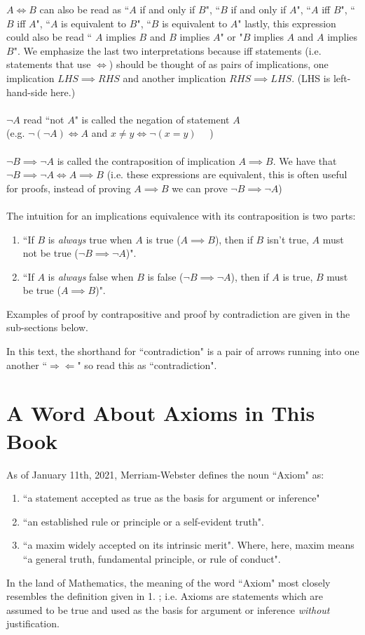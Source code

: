 $A\iff B$ can also be read as ``$A$ if and only if $B$", ``$B$ if and only if $A$", ``$A$ iff $B$", ``$B$ iff $A$", ``$A$ is equivalent to $B$", ``$B$ is equivalent to $A$" lastly, this expression could also be read `` $A$ implies $B$ and $B$ implies $A$" or "$B$ implies $A$ and $A$ implies $B$". We emphasize the last two interpretations because iff statements (i.e. statements that use $\iff$) should be thought of as pairs of implications, one implication $LHS\implies RHS$ and another implication $RHS \implies LHS$. (LHS is left-hand-side here.)\\ \\
$\lnot A$ read ``not $A$" is called the negation of statement $A$ \\(e.g. $\lnot(\lnot A)\iff A$ and $x\neq y \iff \lnot(x=y)$ \ \ ) \\ \\
$\lnot B \implies \lnot A$ is called the contraposition of implication $A \implies B$. We have that $\lnot B \implies \lnot A \iff A\implies B$ (i.e. these expressions are equivalent, this is often useful for proofs, instead of proving $A\implies B$ we can prove $\lnot B \implies \lnot A$)\\ \\
The intuition for an implications equivalence with its contraposition is two parts: 
\begin{enumerate}
    \item ``If $B$ is \textit{always} true when $A$ is true ($A\implies B$), then if $B$ isn't true, $A$ must not be true ($\lnot B \implies \lnot A$)".
    \item ``If $A$ is \textit{always} false when $B$ is false ($\lnot B \implies \lnot A$), then if $A$ is true, $B$ must be true ($A\implies B$)".
\end{enumerate}
Examples of proof by contrapositive and proof by contradiction are given in the sub-sections below.

\noindent In this text, the shorthand for ``contradiction" is a pair of arrows running into one another ``$\Rightarrow\Leftarrow$" so read this as ``contradiction".
\section{A Word About Axioms in This Book}
\label{sec:axioms}
As of January 11th, 2021, Merriam-Webster defines the noun ``Axiom" as:
\begin{enumerate}
    \item ``a statement accepted as true as the basis for argument or inference"
    \item ``an established rule or principle or a self-evident truth".
    \item ``a maxim widely accepted on its intrinsic merit". Where, here, maxim means ``a general truth, fundamental principle, or rule of conduct".
\end{enumerate}
In the land of Mathematics, the meaning of the word ``Axiom" most closely resembles the definition given in 1. ; i.e. Axioms are statements which are assumed to be true and used as the basis for argument or inference \textit{without} justification. 

